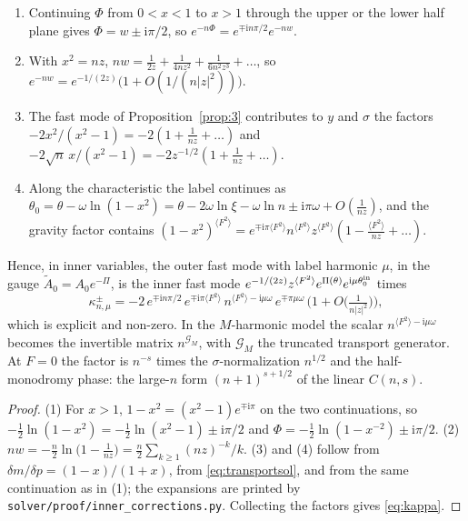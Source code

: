 \documentclass{amsart}
\numberwithin{equation}{section}
\theoremstyle{plain}
\newenvironment{lemnamed}[1]{\renewcommand\theinnerlem{#1}\innerlem}{\endinnerlem}
\theoremstyle{definition}
\theoremstyle{remark}
\newcommand{\iu}{\mathrm{i}}
\newcommand{\repo}[1]{\texttt{#1}}
\begin{document}
\begin{lemnamed}{B5.1}\label{lem:B51}
\begin{enumerate}[label=(\arabic*),leftmargin=2em]
\item Continuing $\Phi$ from $0 < x < 1$ to $x > 1$ through the upper or the lower half plane gives $\Phi = w \pm \iu\pi/2$, so
$e^{-n\Phi} = e^{\mp\iu n\pi/2}e^{-nw}$.
\item With $x^2 = nz$, $nw = \frac1{2z} + \frac1{4nz^2} + \frac1{6n^2z^3} + \dots$, so $e^{-nw} = e^{-1/(2z)}\big(1 + O(1/(n|z|^2))\big)$.
\item The fast mode of Proposition~\ref{prop:3} contributes to $y$ and $\sigma$ the factors $-2x^2/(x^2-1) = -2(1 + \frac1{nz} + \dots)$
and $-2\sqrt n\,x/(x^2-1) = -2z^{-1/2}(1 + \frac1{nz} + \dots)$.
\item Along the characteristic the label continues as
$\theta_0 = \theta - \omega\ln(1 - x^2) = \theta - 2\omega\ln\xi - \omega\ln n \pm \iu\pi\omega + O(\frac1{nz})$, and the gravity factor
contains $(1 - x^2)^{\langle F^2\rangle} = e^{\mp\iu\pi\langle F^2\rangle}n^{\langle F^2\rangle}z^{\langle F^2\rangle}(1 - \frac{\langle F^2\rangle}{nz} + \dots)$.
\end{enumerate}
Hence, in inner variables, the outer fast mode with label harmonic $\mu$, in the gauge $\tilde A_0 = A_0e^{-\Pi}$, is the inner
fast mode $e^{-1/(2z)}z^{\langle F^2\rangle}e^{\Pi(\theta)}e^{\iu\mu\theta_0^{\rm in}}$ times
\begin{equation}\label{eq:kappa}
\kappa^{\pm}_{n,\mu} = -2\,e^{\mp\iu n\pi/2}\,e^{\mp\iu\pi\langle F^2\rangle}\,n^{\langle F^2\rangle - \iu\mu\omega}\,e^{\mp\pi\mu\omega}\,
\Big(1 + O\big(\tfrac1{n|z|^2}\big)\Big),
\end{equation}
which is explicit and non-zero. In the $M$-harmonic model the scalar $n^{\langle F^2\rangle - \iu\mu\omega}$ becomes the invertible
matrix $n^{\mathcal G_M}$, with $\mathcal G_M$ the truncated transport generator. At $F = 0$ the factor is $n^{-s}$ times the
$\sigma$-normalization $n^{1/2}$ and the half-monodromy phase: the large-$n$ form $(n+1)^{s+1/2}$ of the linear $C(n,s)$.
\end{lemnamed}

\begin{proof}
(1) For $x > 1$, $1 - x^2 = (x^2-1)e^{\mp\iu\pi}$ on the two continuations, so $-\tfrac12\ln(1-x^2) = -\tfrac12\ln(x^2-1) \pm \iu\pi/2$
and $\Phi = -\tfrac12\ln(1 - x^{-2}) \pm \iu\pi/2$. (2) $nw = -\tfrac n2\ln\big(1 - \tfrac1{nz}\big) = \tfrac n2\sum_{k\ge1}(nz)^{-k}/k$.
(3) and (4) follow from $\delta m/\delta p = (1-x)/(1+x)$, from \eqref{eq:transportsol}, and from the same continuation as in
(1); the expansions are printed by \repo{solver/proof/inner\_corrections.py}. Collecting the factors gives
\eqref{eq:kappa}.
\end{proof}
\end{document}
